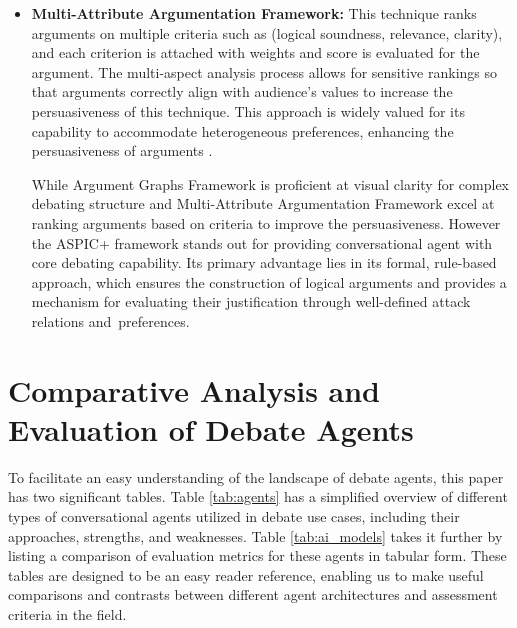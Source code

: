 \documentclass[conference]{IEEEtran}
\begin{document}
\begin{itemize}
    \item \textbf{Multi-Attribute Argumentation Framework:} 
    This technique ranks arguments on multiple criteria such as (logical soundness, relevance, clarity), and each criterion is attached with weights and score is evaluated for the argument. The multi-aspect analysis process allows for sensitive rankings so that arguments correctly align with audience's values to increase the persuasiveness of this technique. This approach is widely valued for its capability to accommodate heterogeneous preferences, enhancing the persuasiveness of arguments \cite{engelmann2022argumentation}.

    While Argument Graphs Framework is proficient at visual clarity for complex debating structure and Multi-Attribute Argumentation Framework excel at ranking arguments based on criteria to improve the persuasiveness. However the ASPIC+ framework stands out for providing conversational agent with core debating capability. Its primary advantage lies in its formal, rule-based approach, which ensures the construction of logical arguments and provides a mechanism for evaluating their justification through well-defined attack relations and preferences.

    
\end{itemize}

\section{Comparative Analysis and Evaluation of Debate Agents}
To facilitate an easy understanding of the landscape of debate agents, this paper has two significant tables. Table \ref{tab:agents} has a simplified overview of different types of conversational agents utilized in debate use cases, including their approaches, strengths, and weaknesses. Table \ref{tab:ai_models} takes it further by listing a comparison of evaluation metrics for these agents in tabular form. These tables are designed to be an easy reader reference, enabling us to make useful comparisons and contrasts between different agent architectures and assessment criteria in the field.
\end{document}

